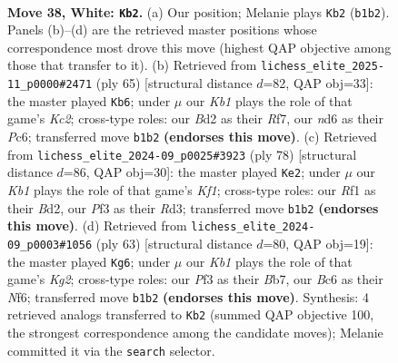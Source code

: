 \documentclass[11pt]{article}
\begin{document}
\clearpage

\begin{figure}[p]\centering
\begin{subfigure}{0.46\textwidth}\centering
\resizebox{\linewidth}{!}{%
\newchessgame
\chessboard[
  setfen={6r1/r7/p1Bnbk2/p4ppp/8/PP3PP1/3B3P/RK3RN1 w - - 3 38},
  showmover=false,
  pgfstyle=straightmove, color=movearrow, markmove={b1-b2}
]}
\caption{}
\end{subfigure}\hfill
\begin{subfigure}{0.46\textwidth}\centering
\resizebox{\linewidth}{!}{%
\newchessgame
\chessboard[
  setfen={8/2k2r1p/2p1p1pB/2n1p2b/1p2P2P/4RP2/1PP3B1/2K5 b - - 5 33},
  showmover=false,
  pgfstyle=straightmove, color=movearrow, markmove={c7-b6}
]}
\caption{}
\end{subfigure}
\\[4pt]
\begin{subfigure}{0.46\textwidth}\centering
\resizebox{\linewidth}{!}{%
\newchessgame
\chessboard[
  setfen={r7/4n3/4ppk1/1r2b1pp/8/pP1RN1PP/P2B1P2/2R2K2 w - - 7 40},
  showmover=false,
  pgfstyle=straightmove, color=movearrow, markmove={f1-e2}
]}
\caption{}
\end{subfigure}\hfill
\begin{subfigure}{0.46\textwidth}\centering
\resizebox{\linewidth}{!}{%
\newchessgame
\chessboard[
  setfen={4r3/pb4k1/5n2/2p1rppp/2B5/1PNRP1PP/P4K2/5R2 b - - 9 32},
  showmover=false,
  pgfstyle=straightmove, color=movearrow, markmove={g7-g6}
]}
\caption{}
\end{subfigure}
\caption{\textbf{Move 38, White: \texttt{Kb2}.} (a) Our position; Melanie plays \texttt{Kb2} (\texttt{b1b2}). Panels (b)--(d) are the retrieved master positions whose correspondence most drove this move (highest QAP objective among those that transfer to it). (b) Retrieved from \texttt{lichess\_elite\_2025-11\_p0000\#2471} (ply 65) [structural distance $d$=82, QAP obj=33]: the master played \texttt{Kb6}; under $\mu$ our \emph{Kb1} plays the role of that game's \emph{Kc2}; cross-type roles: our \emph{B}d2 as their \emph{R}f7, our \emph{n}d6 as their \emph{P}c6; transferred move \texttt{b1b2} \textbf{(endorses this move)}. (c) Retrieved from \texttt{lichess\_elite\_2024-09\_p0025\#3923} (ply 78) [structural distance $d$=86, QAP obj=30]: the master played \texttt{Ke2}; under $\mu$ our \emph{Kb1} plays the role of that game's \emph{Kf1}; cross-type roles: our \emph{R}f1 as their \emph{B}d2, our \emph{P}f3 as their \emph{R}d3; transferred move \texttt{b1b2} \textbf{(endorses this move)}. (d) Retrieved from \texttt{lichess\_elite\_2024-09\_p0003\#1056} (ply 63) [structural distance $d$=80, QAP obj=19]: the master played \texttt{Kg6}; under $\mu$ our \emph{Kb1} plays the role of that game's \emph{Kg2}; cross-type roles: our \emph{P}f3 as their \emph{B}b7, our \emph{B}c6 as their \emph{N}f6; transferred move \texttt{b1b2} \textbf{(endorses this move)}. Synthesis: 4 retrieved analogs transferred to \texttt{Kb2} (summed QAP objective 100, the strongest correspondence among the candidate moves); Melanie committed it via the \texttt{search} selector.}
\label{fig:thought-m74}
\end{figure}
\end{document}

